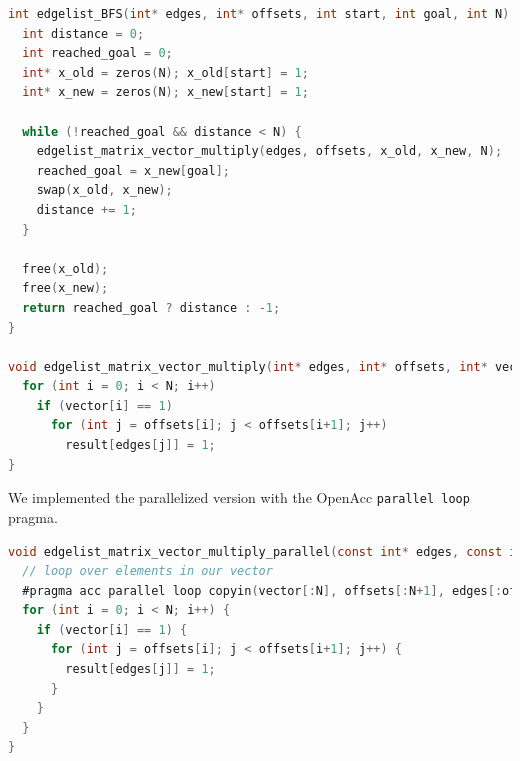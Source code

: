 \documentclass[12pt]{article}
\newcommand*{\ttfamilywithbold}{\fontfamily{lmtt}\selectfont}
\begin{document}
\begin{lstlisting}[language=C,basicstyle=\ttfamilywithbold\footnotesize]
int edgelist_BFS(int* edges, int* offsets, int start, int goal, int N) {
  int distance = 0;
  int reached_goal = 0;
  int* x_old = zeros(N); x_old[start] = 1;
  int* x_new = zeros(N); x_new[start] = 1;

  while (!reached_goal && distance < N) {
    edgelist_matrix_vector_multiply(edges, offsets, x_old, x_new, N);
    reached_goal = x_new[goal];
    swap(x_old, x_new);
    distance += 1;
  }

  free(x_old);
  free(x_new);
  return reached_goal ? distance : -1;
}

void edgelist_matrix_vector_multiply(int* edges, int* offsets, int* vector, int* result, int N) {
  for (int i = 0; i < N; i++)
    if (vector[i] == 1)
      for (int j = offsets[i]; j < offsets[i+1]; j++)
        result[edges[j]] = 1;
}
\end{lstlisting}

We implemented the parallelized version with the OpenAcc \texttt{parallel loop} pragma.

\begin{lstlisting}[language=C,basicstyle=\ttfamilywithbold\footnotesize]
void edgelist_matrix_vector_multiply_parallel(const int* edges, const int* offsets, int* vector, int* result, int N) {
  // loop over elements in our vector
  #pragma acc parallel loop copyin(vector[:N], offsets[:N+1], edges[:offsets[N]]) copyout(result[:N])
  for (int i = 0; i < N; i++) {
    if (vector[i] == 1) {
      for (int j = offsets[i]; j < offsets[i+1]; j++) {
        result[edges[j]] = 1;
      }
    }
  }
}
\end{lstlisting}


\end{document}
